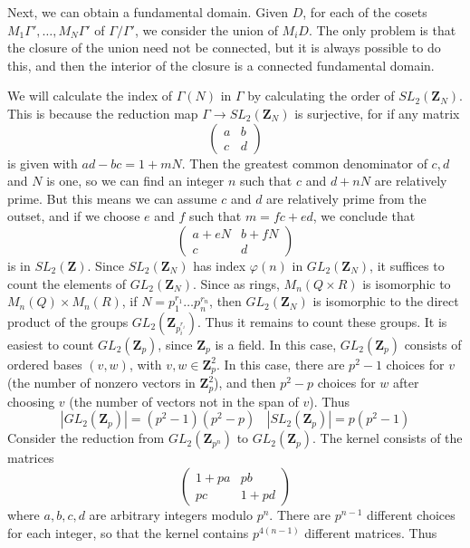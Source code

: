 Next, we can obtain a fundamental domain. Given $D$, for each of the cosets $M_1 \Gamma', \dots, M_N \Gamma'$ of $\Gamma/\Gamma'$, we consider the union of $M_i D$. The only problem is that the closure of the union need not be connected, but it is always possible to do this, and then the interior of the closure is a connected fundamental domain.

\begin{example}
    We will calculate the index of $\Gamma(N)$ in $\Gamma$ by calculating the order of $SL_2(\mathbf{Z}_N)$. This is because the reduction map $\Gamma \to SL_2(\mathbf{Z}_N)$ is surjective, for if any matrix
    \[ \begin{pmatrix} a & b \\ c & d \end{pmatrix} \]
    is given with $ad - bc = 1 + mN$. Then the greatest common denominator of $c,d$ and $N$ is one, so we can find an integer $n$ such that $c$ and $d + nN$ are relatively prime. But this means we can assume $c$ and $d$ are relatively prime from the outset, and if we choose $e$ and $f$ such that $m = fc + ed$, we conclude that
    \[ \begin{pmatrix} a + eN & b + fN \\ c & d \end{pmatrix} \]
    is in $SL_2(\mathbf{Z})$. Since $SL_2(\mathbf{Z}_N)$ has index $\varphi(n)$ in $GL_2(\mathbf{Z}_N)$, it suffices to count the elements of $GL_2(\mathbf{Z}_N)$. Since as rings, $M_n(Q \times R)$ is isomorphic to $M_n(Q) \times M_n(R)$, if $N = p_1^{r_1} \dots p_n^{r_n}$, then $GL_2(\mathbf{Z}_N)$ is isomorphic to the direct product of the groups $GL_2(\mathbf{Z}_{p_i^{r_i}})$. Thus it remains to count these groups. It is easiest to count $GL_2(\mathbf{Z}_p)$, since $\mathbf{Z}_p$ is a field. In this case, $GL_2(\mathbf{Z}_p)$ consists of ordered bases $(v,w)$, with $v,w \in \mathbf{Z}_p^2$. In this case, there are $p^2 - 1$ choices for $v$ (the number of nonzero vectors in $\mathbf{Z}_p^2$), and then $p^2 - p$ choices for $w$ after choosing $v$ (the number of vectors not in the span of $v$). Thus
%
\[ |GL_2(\mathbf{Z}_p)| = (p^2 - 1)(p^2 - p)\ \ \ \ |SL_2(\mathbf{Z}_p)| = p (p^2 - 1) \]
%
Consider the reduction from $GL_2(\mathbf{Z}_{p^n})$ to $GL_2(\mathbf{Z}_p)$. The kernel consists of the matrices
%
\[ \begin{pmatrix} 1 + pa & pb \\ pc & 1 + pd \end{pmatrix} \]
%
where $a,b,c,d$ are arbitrary integers modulo $p^n$. There are $p^{n-1}$ different choices for each integer, so that the kernel contains $p^{4(n-1)}$ different matrices. Thus

\end{example}
